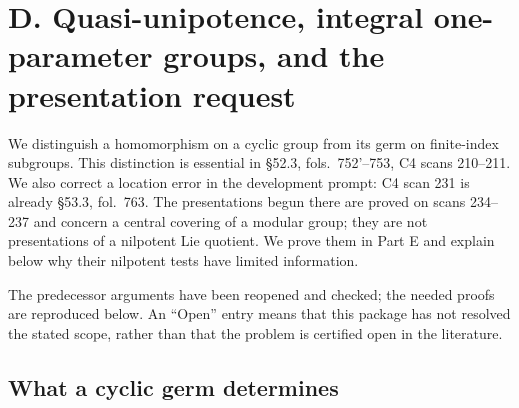 \section{D. Quasi-unipotence, integral one-parameter groups, and the presentation request}
\label{sec:D}

We distinguish a homomorphism on a cyclic group from its germ on finite-index
subgroups.  This distinction is essential in \S52.3, fols.~752'--753,
C4 scans 210--211.  We also correct a location error in the development
prompt: C4 scan 231 is already \S53.3, fol.~763.  The presentations begun
there are proved on scans 234--237 and concern a central covering of a
modular group; they are not presentations of a nilpotent Lie quotient.
We prove them in Part E and explain below why their nilpotent tests have
limited information.

The predecessor arguments \citep[Part E, E.3, E.6, E.10--E.11]{LM1Return2026}
have been reopened and checked; the needed proofs are reproduced below.
An ``Open'' entry means that this package has not resolved the stated
scope, rather than that the problem is certified open in the literature.

\subsection{What a cyclic germ determines}

